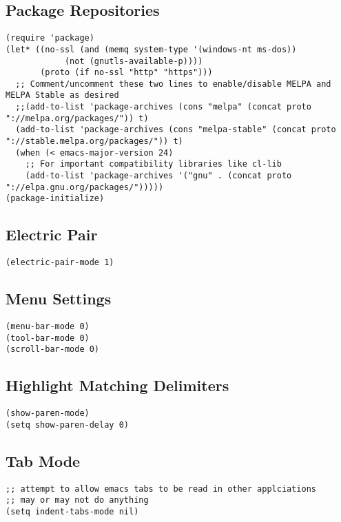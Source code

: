 \documentclass[11pt]{article}
\begin{document}
\subsection{Package Repositories}
\label{sec-1-6}
\begin{verbatim}
(require 'package)
(let* ((no-ssl (and (memq system-type '(windows-nt ms-dos))
		    (not (gnutls-available-p))))
       (proto (if no-ssl "http" "https")))
  ;; Comment/uncomment these two lines to enable/disable MELPA and MELPA Stable as desired
  ;;(add-to-list 'package-archives (cons "melpa" (concat proto "://melpa.org/packages/")) t)
  (add-to-list 'package-archives (cons "melpa-stable" (concat proto "://stable.melpa.org/packages/")) t)
  (when (< emacs-major-version 24)
    ;; For important compatibility libraries like cl-lib
    (add-to-list 'package-archives '("gnu" . (concat proto "://elpa.gnu.org/packages/")))))
(package-initialize)
\end{verbatim}

\subsection{Electric Pair}
\label{sec-1-7}
\begin{verbatim}
(electric-pair-mode 1)
\end{verbatim}

\subsection{Menu Settings}
\label{sec-1-8}
\begin{verbatim}
(menu-bar-mode 0)
(tool-bar-mode 0)
(scroll-bar-mode 0)
\end{verbatim}
\subsection{Highlight Matching Delimiters}
\label{sec-1-9}
\begin{verbatim}
(show-paren-mode)
(setq show-paren-delay 0)
\end{verbatim}
\subsection{Tab Mode}
\label{sec-1-10}

\begin{verbatim}
;; attempt to allow emacs tabs to be read in other applciations
;; may or may not do anything
(setq indent-tabs-mode nil)
\end{verbatim}
\end{document}
